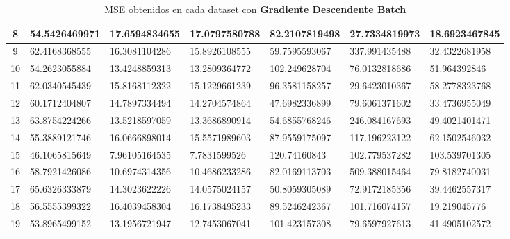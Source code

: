 \documentclass[spanish, fleqn]{article}
\begin{document}
\begin{enumerate}
\begin{table}[!htbp]
\begin{tabular}{|c|l|l|l|l|l|l|}
8 & 54.5426469971 & 17.6594834655 & 17.0797580788 & 82.2107819498 & 27.7334819973 & 18.6923467845 \\ \hline
9 & 62.4168368555 & 16.3081104286 & 15.8926108555 & 59.7595593067 & 337.991435488 & 32.4322681958 \\ \hline
10 & 54.2623055884 & 13.4248859313 & 13.2809364772 & 102.249628704 & 76.0132818686 & 51.964392846 \\ \hline
11 & 62.0340545439 & 15.8168112322 & 15.1229661239 & 96.3581158257 & 29.6423010367 & 58.2778323768 \\ \hline
12 & 60.1712404807 & 14.7897334494 & 14.2704574864 & 47.6982336899 & 79.6061371602 & 33.4736955049 \\ \hline
13 & 63.8754224266 & 13.5218597059 & 13.3686890914 & 54.6855768246 & 246.084167693 & 49.4021401471 \\ \hline
14 & 55.3889121746 & 16.0666898014 & 15.5571989603 & 87.9559175097 & 117.196223122 & 62.1502546032 \\ \hline
15 & 46.1065815649 & 7.96105164535 & 7.7831599526 & 120.74160843 & 102.779537282 & 103.539701305 \\ \hline
16 & 58.7921426086 & 10.6974314356 & 10.4686233286 & 82.0169113703 & 509.388015464 & 79.8182740031 \\ \hline
17 & 65.6326333879 & 14.3023622226 & 14.0575024157 & 50.8059305089 & 72.9172185356 & 39.4462557317 \\ \hline
18 & 56.5555399322 & 16.4039458304 & 16.1738495233 & 89.5246242367 & 101.716074157 & 19.219045776 \\ \hline
19 & 53.8965499152 & 13.1956721947 & 12.7453067041 & 101.423157308 & 79.6597927613 & 41.4905102572 \\ \hline
\end{tabular}
\caption{MSE obtenidos en cada dataset con \textbf{Gradiente Descendente Batch}}
\label{my-label}
\end{table}


\end{enumerate}
\end{document}
